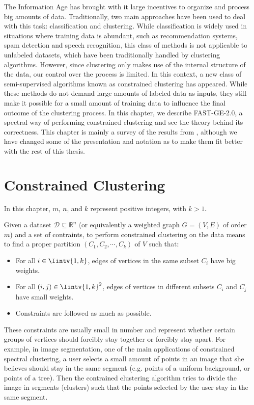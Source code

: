 The Information Age has brought with it large incentives to organize and process big amounts of data.
Traditionally, two main approaches have been used to deal with this task: classification and clustering.
While classification is widely used in situations where training data is abundant, such as recommendation systems, spam detection and speech recognition, this class of methods is not applicable to unlabeled datasets, which have been traditionally handled by clustering algorithms.
However, since clustering only makes use of the internal structure of the data, our control over the process is limited.
In this context, a new class of semi-supervised algorithms known as constrained clustering has appeared.
While these methods do not demand large amounts of labeled data as inputs, they still make it possible for a small amount of training data to influence the final outcome of the clustering process.
In this chapter, we describe FAST-GE-2.0, a spectral way of performing constrained clustering and see the theory behind its correctness.
This chapter is mainly a survey of the results from \cite{fastge2}, although we have changed some of the presentation and notation as to make them fit better with the rest of this thesis.

\section{Constrained Clustering}
In this chapter, $m$, $n$, and $k$ represent positive integers, with $k > 1$.

Given a dataset $\mathcal D \subseteq \mathbb{R}^{n }$ (or equivalently a weighted graph $G = (V,E)$ of order $m$) and a set of contraints, to perform constrained clustering on the data means to find a proper partition $(C_1, C_2, \cdots, C_k)$ of $V$ such that:
\begin{itemize}
   \item For all $i \in \Iintv{1,k}$, edges of vertices in the same subset $C_i$ have big weights.
   \item For all $(i,j) \in \Iintv{1,k}^2$, edges of vertices in different subsets $C_i$ and $C_j$ have small weights.
   \item Constraints are followed as much as possible.
\end{itemize}

These constraints are usually small in number and represent whether certain groups of vertices should forcibly stay together or forcibly stay apart.
For example, in image segmentation, one of the main applications of constrained spectral clustering, a user selects a small amount of points in an image that she believes should stay in the same segment (e.g. points of a uniform background, or points of a tree). Then the contrained clustering algorithm tries to divide the image in segments (clusters) such that the points selected by the user stay in the same segment.



